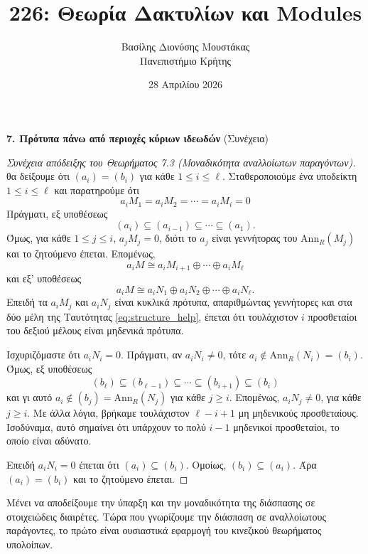 \documentclass[12pt,a4paper,reqno]{amsart}
\title{226: Θεωρία Δακτυλίων και Modules}
\author[Β.~Δ. Μουστακας]{Βασίλης Διονύσης Μουστάκας \\ Πανεπιστήμιο Κρήτης}
\date{28 Απριλίου 2026}
\theoremstyle{definition}
\theoremstyle{remark}
\numberwithin{theorem}{section}
\numberwithin{exercise}{section}
\numberwithin{equation}{section}
\newcommand{\Ann}{\mathrm{Ann}}
\begin{document}
\begingroup
\def\uppercasenonmath#1{} %
\let\MakeUppercase\relax %
\maketitle
\endgroup

\setcounter{section}{7}
\setcounter{theorem}{7}
\setcounter{equation}{5}
\begin{center}
    \textbf{7. Πρότυπα πάνω από περιοχές κύριων ιδεωδών
} (Συνέχεια)
\end{center}

\begin{proof}[Συνέχεια απόδειξης του Θεωρήματος 7.3 (Μοναδικότητα αναλλοίωτων παραγόντων)]
θα δείξουμε ότι $(a_i) = (b_i)$ για κάθε $1 \le i \le \ell$. Σταθεροποιούμε ένα υποδείκτη $1 \le i \le \ell$ και παρατηρούμε ότι 
    \[
    a_iM_1 = a_iM_2 = \cdots = a_iM_i = 0
    \]
    Πράγματι, εξ υποθέσεως 
    \[
    (a_i) \subseteq (a_{i-1}) \subseteq \cdots \subseteq (a_1).
    \]
    Όμως, για κάθε $1 \le j \le i$, $a_jM_j = 0$, διότι το $a_j$ είναι γεννήτορας του $\Ann_R(M_j)$ και το ζητούμενο έπεται. Επομένως, 
    \[
    a_iM \cong a_iM_{i+1} \oplus \cdots \oplus a_iM_\ell
    \]
    και εξ' υποθέσεως
    \begin{equation}  
        \label{eq:structure_help}
        a_iM \cong a_iN_1 \oplus a_iN_2 \oplus \cdots \oplus a_iN_\ell.
    \end{equation}
    Επειδή τα $a_iM_j$ και $a_iN_j$ είναι κυκλικά πρότυπα, απαριθμώντας γεννήτορες και στα δύο μέλη της Ταυτότητας \eqref{eq:structure_help}, έπεται ότι τουλάχιστον $i$ προσθεταίοι του δεξιού μέλους είναι μηδενικά πρότυπα. 
    
    Ισχυριζόμαστε ότι $a_iN_i = 0$. Πράγματι, αν $a_iN_i \neq 0$, τότε $a_i \notin \Ann_R(N_i) = (b_i)$. Όμως, εξ υποθέσεως  
    \[
    (b_\ell) \subseteq (b_{\ell-1}) \subseteq \cdots \subseteq (b_{i+1}) \subseteq (b_i)
    \]
    και γι αυτό $a_i \notin (b_j) = \Ann_R(N_j)$ για κάθε $j \ge i$. Επομένως, $a_iN_j \neq 0$, για κάθε $j \ge i$. Με άλλα λόγια, βρήκαμε τουλάχιστον $\ell -i +1$ μη μηδενικούς προσθεταίους. Ισοδύναμα, αυτό σημαίνει ότι υπάρχουν το πολύ $i-1$ μηδενικοί προσθεταίοι, το οποίο είναι αδύνατο. 
    
    Επειδή $a_iN_i = 0$ έπεται ότι $(a_i) \subseteq (b_i)$. Ομοίως, $(b_i) \subseteq (a_i)$. Άρα $(a_i) = (b_i)$ και το ζητούμενο έπεται.
\end{proof}

Μένει να αποδείξουμε την ύπαρξη και την μοναδικότητα της διάσπασης σε στοιχειώδεις διαιρέτες. Τώρα που γνωρίζουμε την διάσπαση σε αναλλοίωτους παράγοντες, το πρώτο είναι ουσιαστικά εφαρμογή του κινεζικού θεωρήματος υπολοίπων.
\end{document}
